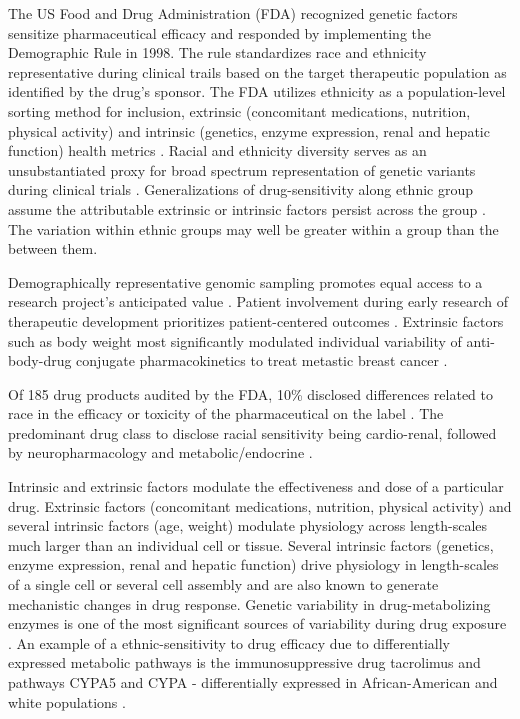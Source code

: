 \documentclass[10pt]{article}
\begin{document}
The US Food and Drug Administration (FDA) recognized genetic factors sensitize pharmaceutical efficacy and responded by implementing the Demographic Rule in 1998.  The rule standardizes race and ethnicity representative during clinical trails based on the target therapeutic population as identified by the drug's sponsor. The FDA utilizes ethnicity as a population-level sorting method for inclusion, extrinsic (concomitant medications, nutrition, physical activity) and intrinsic  (genetics, enzyme expression, renal and hepatic function) health metrics \cite{yasuda2008role}. Racial and ethnicity diversity serves as an unsubstantiated proxy for broad spectrum representation of genetic variants during clinical trials \cite{haga2003fda}. Generalizations of drug-sensitivity along ethnic group assume the attributable extrinsic or intrinsic factors persist across the group \cite{roy2005cyp3a5}. The variation within ethnic groups may well be greater within a group than the between them. 

Demographically representative genomic sampling promotes equal access to a research project's anticipated value \cite{jackson1999african}.  Patient involvement during early research of therapeutic development prioritizes patient-centered outcomes \cite{hoos2015partnering}. Extrinsic factors such as body weight most significantly modulated individual variability of anti-body-drug conjugate pharmacokinetics to treat metastic breast cancer \cite{gupta2012clinical}.

Of 185 drug products audited by the FDA, 10\% disclosed differences related to race in the efficacy or toxicity of the pharmaceutical on the label \cite{evelyn2001participation}. The predominant drug class to disclose racial sensitivity being cardio-renal, followed by neuropharmacology and metabolic/endocrine \cite{evelyn2001participation}. 


Intrinsic and extrinsic factors modulate the effectiveness and dose of a particular drug. Extrinsic factors (concomitant medications, nutrition, physical activity) and several intrinsic factors (age, weight) modulate physiology across length-scales much larger than an individual cell or tissue. Several intrinsic factors (genetics, enzyme expression, renal and hepatic function) drive physiology in length-scales of a single cell or several cell assembly and are also known to generate mechanistic changes in drug response. Genetic variability in drug-metabolizing enzymes is one of the most significant sources of variability during drug exposure \cite{bjornsson2003conduct}.  An example of a ethnic-sensitivity to drug efficacy due to differentially expressed metabolic pathways is the immunosuppressive drug tacrolimus and pathways CYPA5 and CYPA - differentially expressed in African-American and white populations  \cite{roy2005cyp3a5}.
\end{document}
